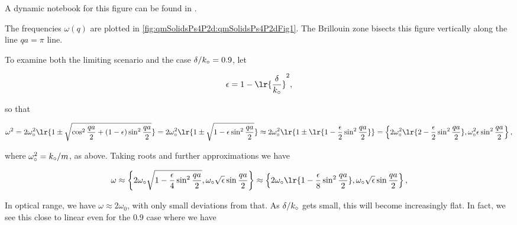 {

A dynamic notebook for this figure can be found in .


The frequencies $\omega(q)$ are plotted in \cref{fig:qmSolidsPs4P2d:qmSolidsPs4P2dFig1}.  The Brillouin zone bisects this figure vertically along the line $q a = \pi$ line.



To examine both the limiting scenario and the case $\delta/k_\circ = 0.9$, let

\begin{dmath}\label{eqn:condensedMatterProblemSet4Problem2:740}
\epsilon = 1 - \lr{\frac{\delta}{k_\nought}}^2,
\end{dmath}

so that

\begin{dmath}\label{eqn:condensedMatterProblemSet4Problem2:760}
\omega^2 
= 2 \omega_\nought^2 \lr{ 1 \pm \sqrt{ \cos^2\frac{qa}{2} + (1 - \epsilon) \sin^2 \frac{qa}{2}} }
= 2 \omega_\nought^2 \lr{ 1 \pm \sqrt{ 1 - \epsilon \sin^2 \frac{qa}{2}} }
\approx 2 \omega_\nought^2 \lr{ 1 \pm \lr{ 1 - \frac{\epsilon}{2} \sin^2 \frac{qa}{2}} }
=
\left\{2 \omega_\nought^2 \lr{ 2 - \frac{\epsilon}{2} \sin^2 \frac{qa}{2} },
\omega_\nought^2 \epsilon \sin^2 \frac{qa}{2}
\right\},
\end{dmath}

where $\omega_\circ^2 = k_\circ/m$, as above.  Taking roots and further approximations we have

\begin{dmath}\label{eqn:condensedMatterProblemSet4Problem2:780}
\omega
\approx
\left\{2 \omega_\nought \sqrt{ 1 - \frac{\epsilon}{4} \sin^2 \frac{qa}{2} },
\omega_\nought \sqrt{\epsilon} \sin \frac{qa}{2} 
\right\}
\approx
\left\{
2 \omega_\nought \lr{ 1 - \frac{\epsilon}{8} \sin^2 \frac{qa}{2} },
\omega_\nought \sqrt{\epsilon} \sin \frac{qa}{2} 
\right\},
\end{dmath}

In optical  range, we have $\omega \approx 2 \omega_0$, with only small deviations from that.  As $\delta/k_\circ$ gets small, this will become increasingly flat.  In fact, we see this close to linear even for the $0.9$ case where we have

}
